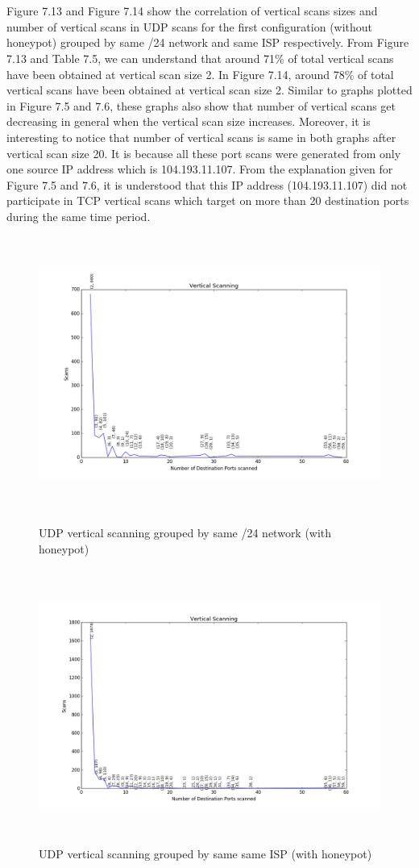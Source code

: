 \\\\
Figure 7.13 and Figure 7.14 show the correlation of vertical scans sizes and number of vertical scans in UDP scans for the first configuration (without honeypot) grouped by same /24 network and same ISP respectively.
From Figure 7.13 and Table 7.5, we can understand that around 71\% of total vertical scans have been obtained at vertical scan size 2.
In Figure 7.14, around 78\% of total vertical scans have been obtained at vertical scan size 2.
Similar to graphs plotted in Figure 7.5 and 7.6, these graphs also show that number of vertical scans get decreasing in general when the vertical scan size increases.
Moreover, it is interesting to notice that number of vertical scans is same in both graphs after vertical scan size 20. 
It is because all these port scans were generated from only one source IP address which is 104.193.11.107.
From the explanation given for Figure 7.5 and 7.6,  it is understood that this IP address (104.193.11.107) did not participate in TCP vertical scans which target on more than 20 destination ports during the same time period.
\begin{figure}[p]
\centering
\includegraphics[width=15cm,height=9cm]{images/verticalscan_udp_classc_honeypot}
\caption{ UDP vertical scanning grouped by same /24 network (with honeypot)}
\centering
\includegraphics[width=16.5cm,height=9cm]{images/verticalscan_udp_isp_honeypot}
\caption{ UDP vertical scanning grouped by same same ISP (with honeypot)}
\end{figure}

